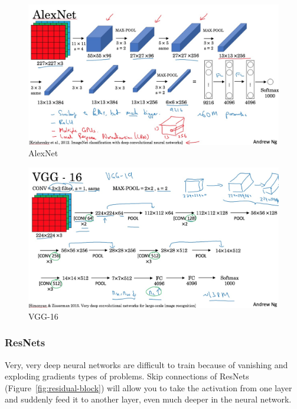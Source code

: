 \documentclass[UTF8]{article}
\begin{document}
\begin{figure}[htb]
    \centering
    \includegraphics[width=40em]{figures/alexnet}
    \caption{AlexNet}
    \label{fig:alexnet}
\end{figure}

\begin{figure}[htb]
    \centering
    \includegraphics[width=40em]{figures/vgg-16}
    \caption{VGG-16}
    \label{fig:vgg-16}
\end{figure}

\subsubsection{ResNets}
Very, very deep neural networks are difficult to train because of vanishing and exploding gradients
types of problems. Skip connections of ResNets (Figure~\ref{fig:residual-block}) will allow you to
take the activation from one layer and suddenly feed it to another layer, even much deeper in the
neural network.
\end{document}
